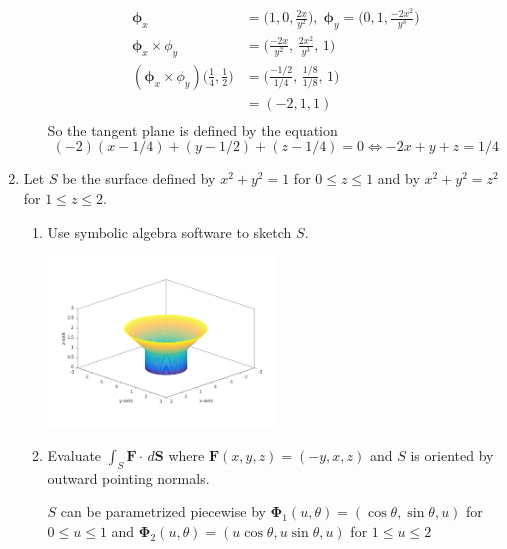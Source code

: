\documentclass{article}
\begin{document}
\begin{enumerate}
\begin{enumerate}
            \begin{align*}
                \boldsymbol \phi_x &= \bigg(1, 0, \frac{2x}{y^2}\bigg), \; \boldsymbol \phi_y = \bigg(0, 1, \frac{-2x^2}{y^3}\bigg) \\
                \boldsymbol \phi_x \times \phi_y &= \bigg(\frac{-2x}{y^2},\, \frac{2x^2}{y^3},\, 1\bigg) \\
                (\boldsymbol \phi_x \times \phi_y) \bigg(\frac{1}{4}, \frac{1}{2}\bigg) &= \bigg(\frac{-1/2}{1/4},\, \frac{1/8}{1/8},\, 1\bigg) \\
                &=(-2,1,1) \\
            \end{align*}
            So the tangent plane is defined by the equation \[ (-2)(x - 1/4) + (y - 1/2) + (z - 1/4) = 0 \Leftrightarrow-2x + y + z = 1/4 \]
        \end{enumerate}  
    \newpage 
    \item Let $S$ be the surface defined by $x^2 + y^2 = 1$ for $0 \leq z \leq 1$ and by $x^2 + y^2 = z^2$ for $1 \leq z \leq 2$.
        \begin{enumerate}
            \item Use symbolic algebra software to sketch $S$.

            \includegraphics[width=0.5\textwidth,center]{b42-a8-4a}
            
            \item Evaluate $\displaystyle \int_S \boldsymbol F \cdot \, d \boldsymbol S $ where $\boldsymbol F (x,y,z) = (-y,x,z)$ and $S$ is oriented by outward pointing normals.

            $S$ can be parametrized piecewise by $\boldsymbol \Phi_1 (u, \theta) = (\cos \theta, \sin \theta, u)$ for $0 \leq u \leq 1$ and $\boldsymbol \Phi_2 (u, \theta) = (u\cos \theta, u\sin \theta, u)$ for $1 \leq u \leq 2$


\end{enumerate}
\end{enumerate}
\end{document}
